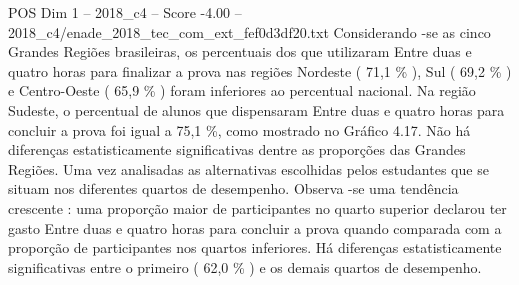 \begin{textsample}{POS Dim 1 – 2018\_c4 – Score -4.00 – 2018\_c4/enade\_2018\_tec\_com\_ext\_fef0d3df20.txt}
Considerando -se as cinco Grandes Regiões brasileiras, os percentuais dos que utilizaram Entre duas e quatro horas para finalizar a prova nas regiões Nordeste ( 71,1 \% ), Sul ( 69,2 \% ) e Centro-Oeste ( 65,9 \% ) foram inferiores ao percentual nacional.
Na região Sudeste, o percentual de alunos que dispensaram Entre duas e quatro horas para concluir a prova foi igual a 75,1 \%, como mostrado no Gráfico 4.17.
Não há diferenças estatisticamente significativas dentre as proporções das Grandes Regiões.
Uma vez analisadas as alternativas escolhidas pelos estudantes que se situam nos diferentes quartos de desempenho.
Observa -se uma tendência crescente : uma proporção maior de participantes no quarto superior declarou ter gasto Entre duas e quatro horas para concluir a prova quando comparada com a proporção de participantes nos quartos inferiores.
Há diferenças estatisticamente significativas entre o primeiro ( 62,0 \% ) e os demais quartos de desempenho.

\end{textsample}
